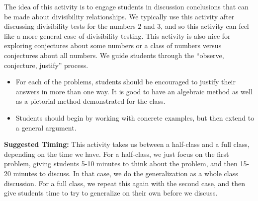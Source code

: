 \documentclass{ximera}
\begin{document}
\newpage
\begin{instructorNotes}
The idea of this activity is to engage students in discussion conclusions that can be made about divisibility relationships.  We typically use this activity after discussing divisibility tests for the numbers $2$ and $3$, and so this activity can feel like a more general case of divisibility testing.  This activity is also nice for exploring conjectures about some numbers or a class of numbers versus conjectures about all numbers.  We guide students through the ``observe, conjecture, justify'' process.

\begin{itemize}
    \item For each of the problems, students should be encouraged to justify their answers in more than one way.  It is good to have an algebraic method as well as a pictorial method demonstrated for the class.
    \item Students should begin by working with concrete examples, but then extend to a general argument.
\end{itemize}

{\bf Suggested Timing:} This activity takes us between a half-class and a full class, depending on the time we have.  For a half-class, we just focus on the first problem, giving students 5-10 minutes to think about the problem, and then 15-20 minutes to discuss.  In that case, we do the generalization as a whole class discussion.  For a full class, we repeat this again with the second case, and then give students time to try to generalize on their own before we discuss.

\end{instructorNotes}

 
\end{document}
